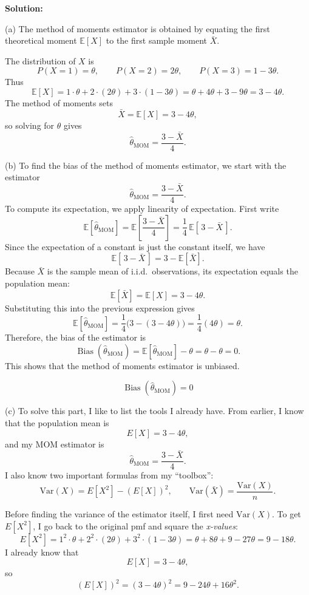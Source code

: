 \documentclass[11pt,letterpaper]{article}
\theoremstyle{remark}
\begin{document}
\vspace{1cm}

\textbf{Solution:}

(a) The method of moments estimator is obtained by equating the first theoretical moment
$\mathbb{E}[X]$ to the first sample moment $\bar X$.

The distribution of $X$ is
\[
P(X = 1) = \theta,\qquad P(X = 2) = 2\theta,\qquad P(X = 3) = 1 - 3\theta.
\]
Thus
\[
\mathbb{E}[X]
= 1 \cdot \theta + 2 \cdot (2\theta) + 3 \cdot (1 - 3\theta)
= \theta + 4\theta + 3 - 9\theta
= 3 - 4\theta.
\]
The method of moments sets
\[
\bar X = \mathbb{E}[X] = 3 - 4\theta,
\]
so solving for $\theta$ gives
\[
\boxed{\hat\theta_{\text{MOM}} = \frac{3 - \bar X}{4}.}
\]

(b) To find the bias of the method of moments estimator, we start with the estimator
\[
\hat{\theta}_{\text{MOM}} = \frac{3 - \bar{X}}{4}.
\]
To compute its expectation, we apply linearity of expectation. First write
\[
\mathbb{E}[\hat{\theta}_{\text{MOM}}]
    = \mathbb{E}\!\left[ \frac{3 - \bar{X}}{4} \right]
    = \frac{1}{4}\,\mathbb{E}[\,3 - \bar{X}\,].
\]
Since the expectation of a constant is just the constant itself, we have
\[
\mathbb{E}[\,3 - \bar{X}\,] = 3 - \mathbb{E}[\bar{X}].
\]
Because $\bar{X}$ is the sample mean of i.i.d.\ observations, its expectation equals the population mean:
\[
\mathbb{E}[\bar{X}] = \mathbb{E}[X] = 3 - 4\theta.
\]
Substituting this into the previous expression gives
\[
\mathbb{E}[\hat{\theta}_{\text{MOM}}]
= \frac{1}{4}\big( 3 - (3 - 4\theta) \big)
= \frac{1}{4}(4\theta)
= \theta.
\]
Therefore, the bias of the estimator is
\[
\operatorname{Bias}(\hat{\theta}_{\text{MOM}})
= \mathbb{E}[\hat{\theta}_{\text{MOM}}] - \theta
= \theta - \theta
= 0.
\]
This shows that the method of moments estimator is unbiased.

\[
\boxed{\operatorname{Bias}(\hat{\theta}_{\text{MOM}}) = 0}
\]

(c) To solve this part, I like to list the tools I already have.
From earlier, I know that the population mean is
\[
E[X] = 3 - 4\theta,
\]
and my MOM estimator is
\[
\hat\theta_{\text{MOM}} = \frac{3 - \bar X}{4}.
\]
I also know two important formulas from my ``toolbox'':
\[
\mathrm{Var}(X) = E[X^2] - (E[X])^2,
\qquad
\mathrm{Var}(\bar X) = \frac{\mathrm{Var}(X)}{n}.
\]

Before finding the variance of the estimator itself, I first need
$\mathrm{Var}(X)$. To get $E[X^2]$, I go back to the original pmf and square
the \emph{x-values}:
\[
E[X^2] = 1^2 \cdot \theta + 2^2 \cdot (2\theta) + 3^2 \cdot (1 - 3\theta)
       = \theta + 8\theta + 9 - 27\theta
       = 9 - 18\theta.
\]
I already know that
\[
E[X] = 3 - 4\theta,
\]
so
\[
(E[X])^2 = (3 - 4\theta)^2 = 9 - 24\theta + 16\theta^2.
\]
\end{document}
